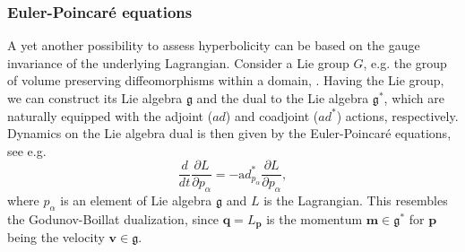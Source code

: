 \documentclass[
10pt, %
a4paper, %
oneside, %
headinclude,footinclude, %
BCOR5mm, %
]{scrartcl}
\newcommand{\mm}{\mathbf{m}}
\newcommand{\vv}{\mathbf{v}}
\newcommand{\qq}{\mathbf{q}}
\newcommand{\pp}{\mathbf{p}}
\newcommand{\MP}[1]{{\color{OliveGreen}MP:\ \ #1}}
\newcommand{\IP}[1]{{\color{Red}IP:\ \ #1}}
\newcommand{\VK}[1]{{\color{Cyan}VK:\ \ #1}}
\begin{document}
\subsubsection{Euler-Poincaré equations}
A yet another possibility to assess hyperbolicity can be based on the gauge invariance of the underlying Lagrangian. Consider a Lie group $G$, e.g.  the group of volume preserving diffeomorphisms within a domain, \cite{Arnold}. Having the Lie group,  we can construct its Lie algebra $\mathfrak{g}$ and the dual to the Lie algebra $\mathfrak{g}^*$, which are naturally equipped with the adjoint ($ad$) and coadjoint ($ad^*$) actions, respectively. Dynamics on the Lie algebra dual is then given by the Euler-Poincaré equations, see e.g. \cite{Holm-Euler-Poincare,Cotter2009}
\begin{equation}\label{eq.EP}
    \frac{d}{dt} \frac{\partial L}{\partial p_\alpha} = -{\mathrm ad}^*_{p_\alpha} \frac{\partial L}{\partial 
    p_\alpha}, 
\end{equation}
where $p_\alpha$ is an element of Lie algebra $\mathfrak{g}$ and $L$ is the 
Lagrangian. This resembles the Godunov-Boillat dualization, since $\qq = L_{\pp}$ is the momentum $\mm\in \mathfrak{g}^*$ 
for $\pp$ being the velocity $\vv\in\mathfrak{g}$. 
\end{document}
